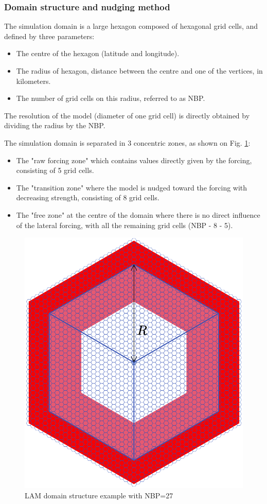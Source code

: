 \subsubsection{Domain structure and nudging method}

The simulation domain is a large hexagon composed of hexagonal grid cells, and defined by three parameters:
\begin{itemize}
    \item The centre of the hexagon (latitude and longitude).
    \item The radius of hexagon, distance between the centre and one of the vertices, in kilometers.
    \item The number of grid cells on this radius, referred to as NBP.
\end{itemize}

The resolution of the model (diameter of one grid cell) is directly obtained by dividing the radius by the NBP.

\hfill

The simulation domain is separated in 3 concentric zones, as shown on Fig. \ref{fig:LAM_domain}: 
\begin{itemize}
    \item The "raw forcing zone" which contains values directly given by the forcing, consisting of 5 grid cells.
    \item The "transition zone"  where the model is nudged toward the forcing with decreasing strength, consisting of 8 grid cells.
    \item The "free zone" at the centre of the domain where there is no direct influence of the lateral forcing, with all the remaining grid cells (NBP - 8 - 5).
\end{itemize} 

\begin{figure}[ht]
    \centering
    \includegraphics[width=0.5\linewidth]{images/LAM_domain_zones.png}
    \caption{LAM domain structure example with NBP=27 \citep[from][]{raillard_leveraging_2024}}
    \label{fig:LAM_domain}
\end{figure}

